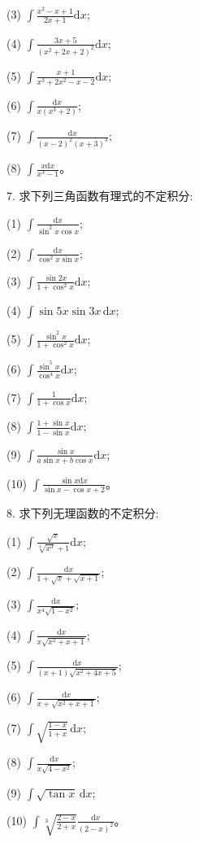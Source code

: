 \documentclass[UTF8, 12pt, fontset=fandol, oneside]{ctexart}
\begin{document}
(3) $\displaystyle \int\frac{x^2-x+1}{2x+1}\mathrm dx$;

(4) $\displaystyle \int\frac{3x+5}{(x^2+2x+2)^2}\mathrm dx$;

(5) $\displaystyle \int\frac{x+1}{x^3+2x^2-x-2}\mathrm dx$;

(6) $\displaystyle \int\frac{\mathrm dx}{x(x^3+2)}$;

(7) $\displaystyle \int\frac{\mathrm dx}{(x-2)^2(x+3)^3}$;

(8) $\displaystyle \int\frac{x\mathrm dx}{x^3-1}$。

7. 求下列三角函数有理式的不定积分:

(1) $\displaystyle \int\frac{\mathrm dx}{\sin^2x\cos x}$;

(2) $\displaystyle \int\frac{\mathrm dx}{\cos^2x\sin x}$;

(3) $\displaystyle \int\frac{\sin2x}{1+\cos^2x}\mathrm dx$;

(4) $\displaystyle \int\sin5x\sin3x\,\mathrm dx$;

(5) $\displaystyle \int\frac{\sin^2x}{1+\cos^2x}\mathrm dx$;

(6) $\displaystyle \int\frac{\sin^5x}{\cos^4x}\mathrm dx$;

(7) $\displaystyle \int\frac1{1+\cos x}\mathrm dx$;

(8) $\displaystyle \int\frac{1+\sin x}{1-\sin x}\mathrm dx$;

(9) $\displaystyle \int\frac{\sin x}{a\sin x+b\cos x}\mathrm dx$;

(10) $\displaystyle \int\frac{\sin x\mathrm dx}{\sin x-\cos x+2}$。

8. 求下列无理函数的不定积分:

(1) $\displaystyle \int\frac{\sqrt x}{\sqrt[4]{x^3}+1}\mathrm dx$;

(2) $\displaystyle \int\frac{\mathrm dx}{1+\sqrt x+\sqrt{x+1}}$;

(3) $\displaystyle \int\frac{\mathrm dx}{x^4\sqrt{1-x^2}}$;

(4) $\displaystyle \int\frac{\mathrm dx}{x\sqrt{x^2+x+1}}$;

(5) $\displaystyle \int\frac{\mathrm dx}{(x+1)\sqrt{x^2+4x+5}}$;

(6) $\displaystyle \int\frac{\mathrm dx}{x+\sqrt{x^2+x+1}}$;

(7) $\displaystyle \int\sqrt{\frac{1-x}{1+x}}\,\mathrm dx$;

(8) $\displaystyle \int\frac{\mathrm dx}{x\sqrt{4-x^2}}$;

(9) $\displaystyle \int\sqrt{\tan x}\,\mathrm dx$;

(10) $\displaystyle \int\sqrt[3]{\frac{2-x}{2+x}}\frac{\mathrm dx}{(2-x)^2}$。
\end{document}
